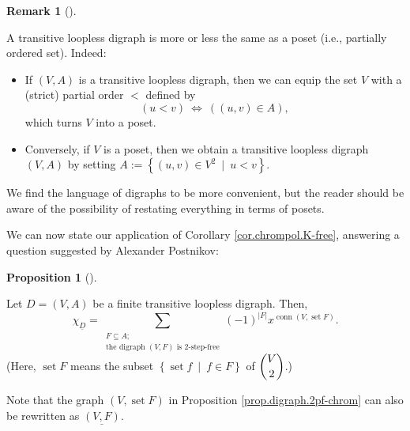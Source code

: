 \documentclass[numbers=enddot,12pt,final,onecolumn,notitlepage]{scrartcl}%
\theoremstyle{definition}
\newtheorem{prop}[theo]{Proposition}
\newenvironment{proposition}[1][]
{\begin{prop}[#1]\begin{leftbar}}
{\end{leftbar}\end{prop}}
\newtheorem{remk}[theo]{Remark}
\newenvironment{remark}[1][]
{\begin{remk}[#1]\begin{leftbar}}
{\end{leftbar}\end{remk}}
\let\sumnonlimits\sum
\renewcommand{\sum}{\sumnonlimits\limits}
\begin{document}
\begin{remark}
A transitive loopless digraph is more or less the same as a poset (i.e.,
partially ordered set). Indeed:

\begin{itemize}
\item If $\left(  V,A\right)  $ is a transitive loopless digraph, then we can
equip the set $V$ with a (strict) partial order $<$ defined by
\[
\left(  u<v\right)  \ \Longleftrightarrow\ \left(  \left(  u,v\right)  \in
A\right)  ,
\]
which turns $V$ into a poset.

\item Conversely, if $V$ is a poset, then we obtain a transitive loopless
digraph $\left(  V,A\right)  $ by setting $A:=\left\{  \left(  u,v\right)  \in
V^{2}\ \mid\ u<v\right\}  $.
\end{itemize}

We find the language of digraphs to be more convenient, but the reader should
be aware of the possibility of restating everything in terms of posets.
\end{remark}

We can now state our application of Corollary \ref{cor.chrompol.K-free},
answering a question suggested by Alexander Postnikov:

\begin{proposition}
\label{prop.digraph.2pf-chrom}Let $D=\left(  V,A\right)  $ be a finite
transitive loopless digraph. Then,%
\[
\chi_{\underline{D}}=\sum_{\substack{F\subseteq A;\\\text{the digraph }\left(
V,F\right)  \text{ is }2\text{-step-free}}}\left(  -1\right)  ^{\left\vert
F\right\vert }x^{\operatorname*{conn}\left(  V,\operatorname*{set}F\right)
}.
\]
(Here, $\operatorname*{set}F$ means the subset $\left\{  \operatorname*{set}%
f\ \mid\ f\in F\right\}  $ of $\dbinom{V}{2}$.)
\end{proposition}

Note that the graph $\left(  V,\operatorname*{set}F\right)  $ in Proposition
\ref{prop.digraph.2pf-chrom} can also be rewritten as $\underline{\left(
V,F\right)  }$.
\end{document}
